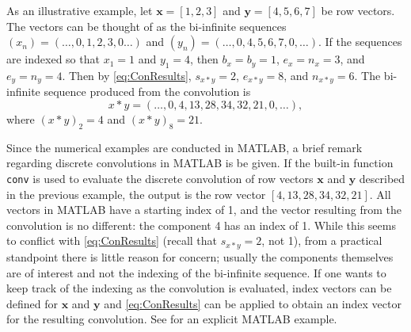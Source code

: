 \documentclass[12pt,notitlepage]{report}
\begin{document}
As an illustrative example, let $\mathbf{x} = [1,2,3]$ and $\mathbf{y} = [4,5,6,7]$ be row vectors. The vectors can be thought of as the bi-infinite sequences $(x_n) = (\ldots,0,1,2,3,0\ldots)$ and $(y_n) = (\ldots,0,4,5,6,7,0,\ldots)$. If the sequences are indexed so that $x_1 = 1$ and $y_1 = 4$, then $b_x = b_y = 1$, $e_x = n_x = 3$, and $e_y = n_y = 4$. Then by \eqref{eq:ConResults}, $s_{x*y} = 2$, $e_{x*y} = 8$, and $n_{x*y} = 6$. The bi-infinite sequence produced from the convolution is
\[x*y = (\ldots,0,4,13,28,34,32,21,0,\ldots),\]
where $(x*y)_2 = 4$ and $(x*y)_8 = 21$. \par 
Since the numerical examples are conducted in MATLAB, a brief remark regarding discrete convolutions in MATLAB is be given. If the built-in function \texttt{conv} is used to evaluate the discrete convolution of row vectors $\mathbf{x}$ and $\mathbf{y}$ described in the previous example, the output is the row vector $[4,13,28,34,32,21]$.  All vectors in MATLAB have a starting index of 1, and the vector resulting from the convolution is no different: the component 4 has an index of 1. While this seems to conflict with \eqref{eq:ConResults} (recall that $s_{x*y} = 2$, not 1), from a practical standpoint there is little reason for concern; usually the components themselves are of interest and not the indexing of the bi-infinite sequence. If one wants to keep track of the indexing as the convolution is evaluated, index vectors can be defined for $\mathbf{x}$ and $\mathbf{y}$ and \eqref{eq:ConResults} can be applied to obtain an index vector for the resulting convolution. See \cite{BoggessNarcowich2009} for an explicit MATLAB example. \par 
\end{document}
